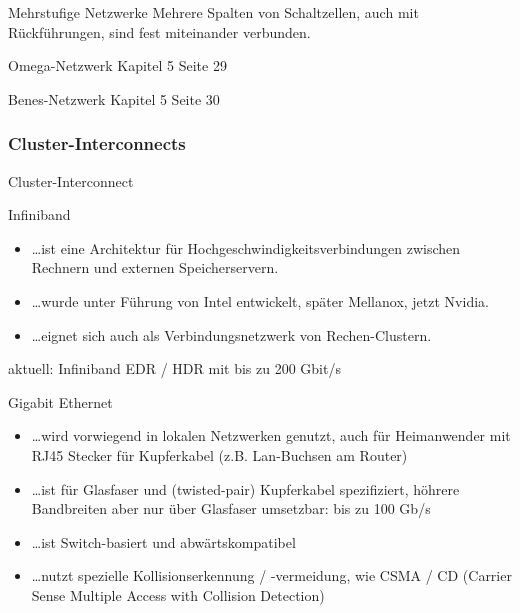 \begin{defi}{Mehrstufige Netzwerke}
    Mehrere Spalten von Schaltzellen, auch mit Rückführungen, 
    sind fest miteinander verbunden.
\end{defi}

\begin{defi}{Omega-Netzwerk}
    Kapitel 5 Seite 29
\end{defi}

\begin{defi}{Benes-Netzwerk}
    Kapitel 5 Seite 30
\end{defi}

\subsubsection{Cluster-Interconnects}

\begin{defi}{Cluster-Interconnect}
    
\end{defi}

\begin{defi}{Infiniband}
    \begin{itemize}
        \item \ldots ist eine Architektur für Hochgeschwindigkeitsverbindungen zwischen Rechnern und externen Speicherservern.
        \item \ldots wurde unter Führung von Intel entwickelt, später Mellanox, jetzt Nvidia.
        \item \ldots eignet sich auch als Verbindungsnetzwerk von Rechen-Clustern.
    \end{itemize}
    aktuell: Infiniband EDR / HDR mit bis zu 200 Gbit/s
\end{defi}

\begin{defi}{Gigabit Ethernet}
    \begin{itemize}
        \item \ldots wird vorwiegend in lokalen Netzwerken genutzt,
              auch für Heimanwender mit RJ45 Stecker für Kupferkabel (z.B. Lan-Buchsen am Router)
        \item \ldots ist für Glasfaser und (twisted-pair) Kupferkabel spezifiziert,
              höhrere Bandbreiten aber nur über Glasfaser umsetzbar: bis zu 100 Gb/s
        \item \ldots ist Switch-basiert und abwärtskompatibel
        \item \ldots nutzt spezielle Kollisionserkennung / -vermeidung,
              wie CSMA / CD (Carrier Sense Multiple Access with Collision Detection)
    \end{itemize}
\end{defi}

